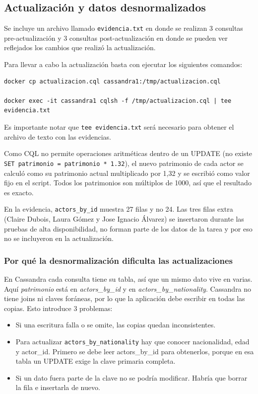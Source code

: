 \documentclass[11pt,a4paper]{article}
\begin{document}
\subsection{Actualización y datos desnormalizados}
Se incluye un archivo llamado \texttt{evidencia.txt} en donde se realizan 3 consultas pre-actualización y 3 consultas post-actualización 
en donde se pueden ver reflejados los cambios que realizó la actualización.

Para llevar a cabo la actualización basta con ejecutar los siguientes comandos:
\begin{lstlisting}
docker cp actualizacion.cql cassandra1:/tmp/actualizacion.cql

docker exec -it cassandra1 cqlsh -f /tmp/actualizacion.cql | tee evidencia.txt
\end{lstlisting}
Es importante notar que \texttt{tee evidencia.txt} será necesario para obtener el archivo de texto con las evidencias.

Como CQL no permite operaciones aritméticas dentro de un UPDATE (no existe \texttt{SET patrimonio = patrimonio * 1.32}),
el nuevo patrimonio de cada actor se calculó como su patrimonio actual multiplicado por 1,32 y se escribió como valor
fijo en el script. Todos los patrimonios son múltiplos de 1000, así que el resultado es exacto.

En la evidencia, \texttt{actors\_by\_id} muestra 27 filas y no 24. Las tres filas extra (Claire Dubois, Laura Gómez y
Jose Ignacio Álvarez) se insertaron durante las pruebas de alta disponibilidad, no forman parte de los datos de la tarea
y por eso no se incluyeron en la actualización.

\subsubsection{Por qué la desnormalización dificulta las actualizaciones}
En Cassandra cada consulta tiene su tabla, así que un mismo dato vive en varias. Aquí \textit{patrimonio} está en \textit{actors\_by\_id} y en \textit{actors\_by\_nationality}. Cassandra
no tiene joins ni claves foráneas, por lo que la aplicación debe escribir en todas las copias. Esto introduce 3 problemas:
\begin{itemize}
	\item Si una escritura falla o se omite, las copias quedan inconsistentes.
	\item Para actualizar \texttt{actors\_by\_nationality} hay que conocer nacionalidad, edad y actor\_id. Primero se debe leer actors\_by\_id para obtenerlos, porque en esa tabla un UPDATE exige la clave primaria completa.
	\item Si un dato fuera parte de la clave no se podría modificar. Habría que borrar la fila e insertarla de nuevo.
\end{itemize}
\end{document}
